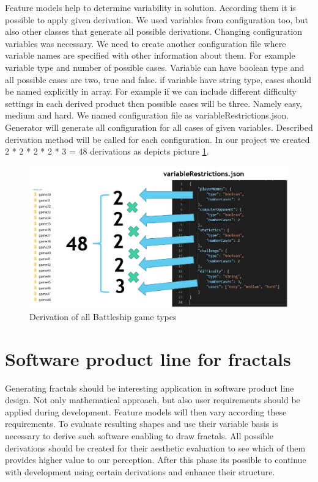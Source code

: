\documentclass[11pt,slovak,a4paper,twoside]{article}
\begin{document}
Feature models help to determine variability in solution. According them it is possible to apply given derivation. We used variables from configuration too, but also other classes that generate all possible derivations. Changing configuration variables was necessary. We need to create another configuration file where variable names are specified with other information about them. For example variable type and number of possible cases. Variable can have boolean type and all possible cases are two, true and false. if variable have string type, cases should be named explicitly in array. For example if we can include different difficulty settings in each derived product then possible cases will be three. Namely easy, medium and hard. We named configuration file as variableRestrictions.json. Generator will generate all configuration for all cases of given variables. Described derivation method will be called for each configuration. In our project we created 2 * 2 * 2 * 2 * 3 = 48 derivations as depicts picture \ref{derivationBattleshipTypes}.  

\begin{figure}[!t]  %
					\begin{center}
									\includegraphics[width=\linewidth]{fig/allCases.png}
									\caption{Derivation of all Battleship game types}
									\label{derivationBattleshipTypes}
					\end{center}
\end{figure}


\section{Software product line for fractals} \label{fractalProductLine}

Generating fractals should be interesting application in software product line design. Not only mathematical approach, but also user requirements should be applied during development. Feature models will then vary according these requirements. To evaluate resulting shapes and use their variable basis is necessary to derive such software enabling to draw fractals. All possible derivations should be created for their aesthetic evaluation to see which of them provides higher value to our perception. After this phase its possible to continue with development using certain derivations and enhance their structure.
\end{document}
